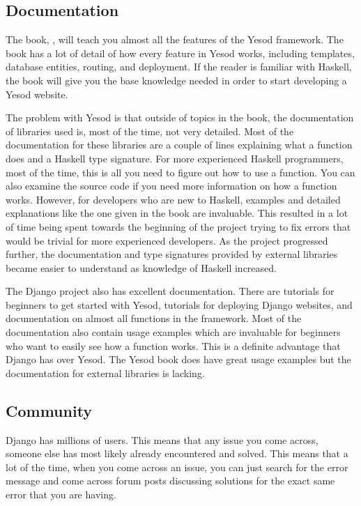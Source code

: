 \subsection{Documentation}

The book, , will teach you almost all the features of the
Yesod framework. The book has a lot of detail of how every feature in Yesod works,
including templates, database entities, routing, and deployment. If the reader
is familiar with Haskell, the book will give you the base knowledge needed
in order to start developing a Yesod website.

The problem with Yesod is that outside of topics in the book, the documentation
of libraries used is, most of the time, not very detailed. Most of the documentation
for these libraries are a couple of lines explaining what a function does and
a Haskell type signature. For more experienced Haskell programmers, most of the
time, this is all you need to figure out how to use a function. You can also
examine the source code if you need more information on how a function works.
However, for developers who are new to Haskell, examples and detailed explanations
like the one given in the book are invaluable. This resulted in a lot of time
being spent towards the beginning of the project trying to fix errors that would be
trivial for more experienced developers. As the project progressed further, the 
documentation and type signatures provided by external libraries became easier to 
understand as knowledge of Haskell increased.

The Django project also has excellent documentation. There are tutorials for
beginners to get started with Yesod, tutorials for deploying Django websites,
and documentation on almost all functions in the framework. Most of the
documentation also contain usage examples which are invaluable for
beginners who want to easily see how a function works. This is a definite
advantage that Django has over Yesod. The Yesod book does have great
usage examples but the documentation for external libraries is lacking.

\subsection{Community}

Django has millions of users. This means that any issue you come across,
someone else has most likely already encountered and solved. This means that
a lot of the time, when you come across an issue, you can just search for
the error message and come across forum posts discussing solutions
for the exact same error that you are having.


